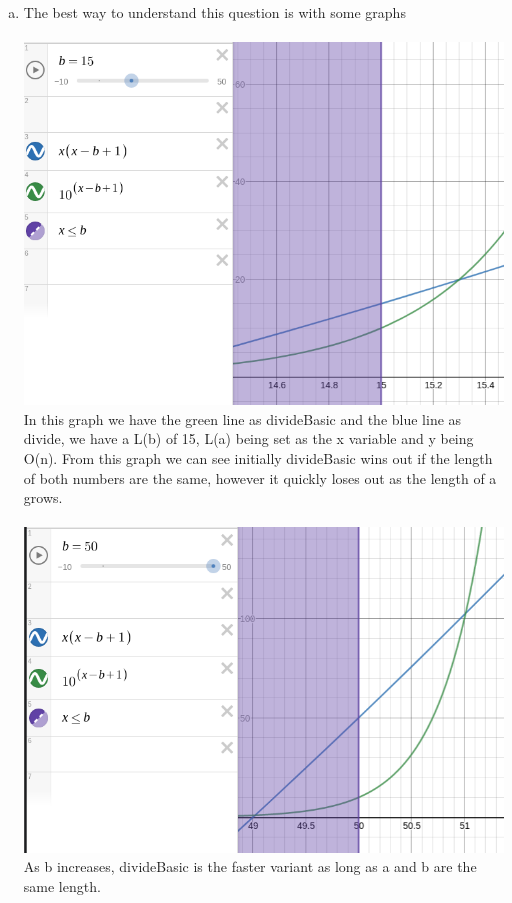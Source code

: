 \documentclass[journal,a4paper]{article}
\begin{document}
\begin{enumerate}[(a)]
	\item The best way to understand this question is with some graphs
	\\\\
	\includegraphics[scale=2]{divide-complexity-1} \\
	In this graph we have the green line as divideBasic and the blue line as divide, we have a L(b) of 15, L(a) being set as the x variable and y being O(n). From this graph we can see initially divideBasic wins out if the length of both numbers are the same, however it quickly loses out as the length of a grows.
	\\\\
	\includegraphics[scale=2]{divide-complexity-2} \\
	As b increases, divideBasic is the faster variant as long as a and b are the same length.

\end{enumerate}
\end{document}

